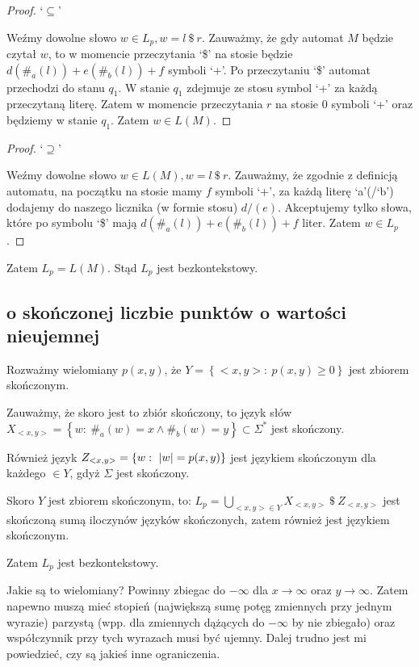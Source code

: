 \documentclass{article}
\theoremstyle{definition}
\theoremstyle{remark}
\begin{document}
\begin{proof}
    `\(\subseteq\)'

    Weźmy dowolne słowo \(w \in L_p, w = l \ \$ \ r\).
    Zauważmy, że gdy automat \(M\) będzie czytał \(w\),
    to w momencie przeczytania `\$' na stosie będzie \(d(\#_{a}(l))+e(\#_{b}(l))+f\) symboli `+'.
    Po przeczytaniu `\$' automat przechodzi do stanu \(q_1\).
    W stanie \(q_1\) zdejmuje ze stosu symbol `+' za każdą przeczytaną literę.
    Zatem w momencie przeczytania \(r\) na stosie 0 symboli `+' oraz będziemy w stanie \(q_1\).
    Zatem \(w \in L(M)\).
\end{proof}
\begin{proof}
    `\(\supseteq\)'

    Weźmy dowolne słowo \(w \in L(M), w = l \ \$ \ r\).
    Zauważmy, że zgodnie z definicją automatu,
    na początku na stosie mamy \(f\) symboli `+',
    za każdą literę `a'(/`b') dodajemy do naszego licznika (w formie stosu) \(d/(e)\).
    Akceptujemy tylko słowa, które po symbolu `\$' mają \(d(\#_{a}(l))+e(\#_{b}(l))+f\) liter.
    Zatem \(w \in L_p\).
\end{proof}

Zatem \(L_p = L(M)\).
Stąd \(L_p\) jest bezkontekstowy.

\subsection{o skończonej liczbie punktów o wartości nieujemnej}

Rozważmy wielomiany \(p(x,y)\), że \( Y = \left\{ <x,y>: \ p(x,y) \geq 0 \right\}\) jest zbiorem skończonym.

Zauważmy, że skoro jest to zbiór skończony, to język słów \( X_{<x,y>} = \left\{ w: \ \#_a(w) = x \land \#_b(w) = y \right\} \subset \Sigma^* \) jest skończony.

Również język \(Z_{<x,y>} = \left\{ w: \ \abs{w} = p(x,y) \right\}\) jest językiem skończonym dla każdego \(<x,y> \in Y\), gdyż \(\Sigma\) jest skończony.

Skoro \(Y\) jest zbiorem skończonym, to: 
\(L_p = \bigcup_{<x,y> \in Y} {X_{<x,y>}\ \$ \ Z_{<x,y>}} \) jest skończoną sumą iloczynów języków skończonych, zatem również jest językiem skończonym.

Zatem \(L_p\) jest bezkontekstowy.

Jakie są to wielomiany?
Powinny zbiegac do \(- \infty\) dla \(x \to \infty\) oraz \(y \to \infty\).
Zatem napewno muszą mieć stopień (największą sumę potęg zmiennych przy jednym wyrazie) parzystą (wpp. dla zmiennych dążących do \(-\infty\) by nie zbiegało) oraz współczynnik przy tych wyrazach musi być ujemny.
Dalej trudno jest mi powiedzieć, czy są jakieś inne ograniczenia.
\end{document}

